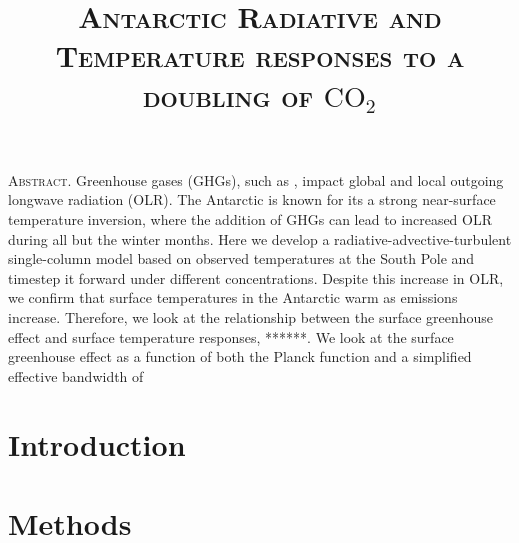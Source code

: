 \documentclass[12]{article}
\title{{\textsc{\Large Antarctic Radiative and Temperature responses to a doubling of $\text{CO}_2$}}}
\author{\textsc{}}
\begin{document}
\maketitle
\thispagestyle{empty}

\setlength{\leftskip}{1.1cm}
\setlength{\rightskip}{1.1cm}


\bigskip
\bigskip

{\textsc{Abstract.} }Greenhouse gases (GHGs), such as , impact global and local outgoing longwave radiation (OLR). The Antarctic is known for its a strong near-surface temperature inversion, where the addition of GHGs can lead to increased OLR during all but the winter months.  Here we develop a radiative-advective-turbulent single-column model based on observed temperatures at the South Pole and timestep it forward under different  concentrations. Despite this increase in OLR, we confirm that surface temperatures in the Antarctic warm as  emissions increase. Therefore, we look at the relationship between the surface greenhouse effect and surface temperature responses, ******. We look at the surface greenhouse effect as a function of both the Planck function and a simplified effective bandwidth of  








\section{Introduction}
\section{Methods}
\end{document}
